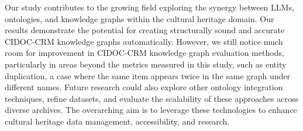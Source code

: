 \documentclass[a4, conference]{IEEEtran}
\begin{document}
Our study contributes to the growing field exploring the synergy between LLMs, ontologies, and knowledge graphs within the cultural heritage domain. Our results demonstrate the potential for creating structurally sound and accurate CIDOC-CRM knowledge graphs automatically. However, we still notice much room for improvement in CIDOC-CRM knowledge graph evaluation methods, particularly in areas beyond the metrics measured in this study, such as entity duplication, a case where the same item appears twice in the same graph under different names. Future research could also explore other ontology integration techniques, refine datasets, and evaluate the scalability of these approaches across diverse archives. The overarching aim is to leverage these technologies to enhance cultural heritage data management, accessibility, and research.




\end{document}
